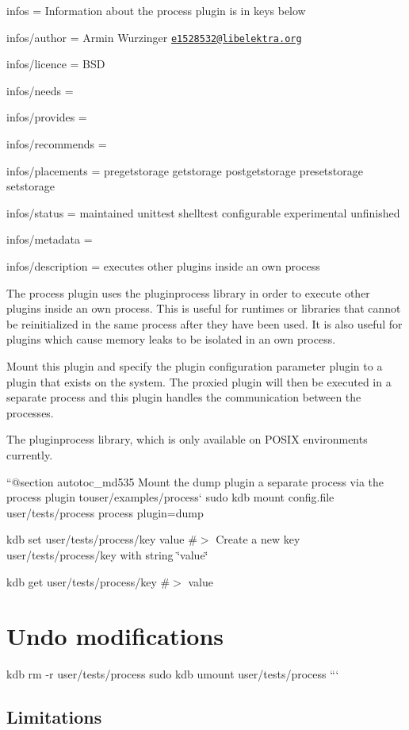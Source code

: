 
\begin{DoxyItemize}
\item infos = Information about the process plugin is in keys below
\item infos/author = Armin Wurzinger \href{mailto:e1528532@libelektra.org}{\tt e1528532@libelektra.\+org}
\item infos/licence = B\+SD
\item infos/needs =
\item infos/provides =
\item infos/recommends =
\item infos/placements = pregetstorage getstorage postgetstorage presetstorage setstorage
\item infos/status = maintained unittest shelltest configurable experimental unfinished
\item infos/metadata =
\item infos/description = executes other plugins inside an own process
\end{DoxyItemize}

The process plugin uses the {\ttfamily pluginprocess} library in order to execute other plugins inside an own process. This is useful for runtimes or libraries that cannot be reinitialized in the same process after they have been used. It is also useful for plugins which cause memory leaks to be isolated in an own process.

Mount this plugin and specify the plugin configuration parameter {\ttfamily plugin} to a plugin that exists on the system. The proxied plugin will then be executed in a separate process and this plugin handles the communication between the processes.

The {\ttfamily pluginprocess} library, which is only available on P\+O\+S\+IX environments currently.

``{\ttfamily  @section autotoc\+\_\+md535 Mount the dump plugin a separate process via the process plugin to}user/examples/process` sudo kdb mount config.\+file user/tests/process process plugin=dump

kdb set user/tests/process/key value \#$>$ Create a new key user/tests/process/key with string \char`\"{}value\char`\"{}

kdb get user/tests/process/key \#$>$ value\hypertarget{autotoc_md531_autotoc_md536}{}\section{Undo modifications}\label{autotoc_md531_autotoc_md536}
kdb rm -\/r user/tests/process sudo kdb umount user/tests/process ```\hypertarget{autotoc_md531_autotoc_md537}{}\subsection{Limitations}\label{autotoc_md531_autotoc_md537}

